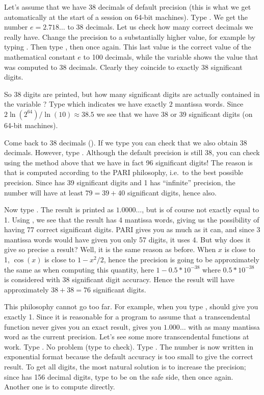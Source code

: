Let's assume that we have 38 decimals of default precision (this is what we
get automatically at the start of a  session on 64-bit machines). Type
. We get the number $e=2.718\dots$ to 38 decimals. Let us check
how many correct decimals we really have. Change the precision to a
substantially higher value, for example by typing . Then type
, then  once again. This last value is the correct value
of the mathematical constant $e$ to 100 decimals, while the variable 
shows the value that was computed to 38 decimals. Clearly they coincide to
exactly 38 significant digits.

So 38 digits are printed, but how many significant digits are actually
contained in the variable ? Type  which indicates we have
exactly $2$ mantissa words. Since $2\ln(2^{64}) / \ln(10)\approx38.5$ we see
that we have 38 or 39 significant digits (on 64-bit machines).

\smallskip
Come back to 38 decimals (). If we type 
you can check that we also obtain 38 decimals. However, type
. Although the default precision is still 38,
you can check using the method above that we have in fact 96 significant
digits! The reason is that  is computed according to the PARI
philosophy, i.e.~to the best possible precision. Since  has 39
significant digits and 1 has ``infinite'' precision, the number  will have at least $79=39+40$ significant digits, hence  also.

Now type . The result is printed as $1.0000\dots$, but
is of course not exactly equal to 1. Using \kbd{\#\%}, we see that the
result has 4 mantissa words, giving us the possibility of having 77
correct significant digits. PARI gives you as much as it can, and since 3
mantissa words would have given you only 57 digits, it uses 4. But why does
it give so precise a result? Well, it is the same reason as before. When $x$
is close to 1, $\cos(x)$ is close to $1-x^2/2$, hence the precision is going
to be approximately the same as when computing this quantity, here
$1-0.5*10^{-38}$ where $0.5*10^{-38}$ is considered with 38 significant digit
accuracy. Hence the result will have approximately $38+38=76$ significant
digits.

This philosophy cannot go too far. For example, when you type ,
 should give you exactly 1. Since it is reasonable for a program to
assume that a transcendental function never gives you an exact result,
 gives you $1.000\dots$ with as many mantissa word as the current
precision.
\medskip
Let's see some more transcendental functions at work. Type
. No problem (type  to check). Type .
The number is now written in exponential format because the default accuracy
is too small to give the correct result. To get all digits, the most natural
solution is to increase the precision; since  has 156 decimal
digits, type  to be on the safe side, then 
once again. Another one is to compute  directly.

